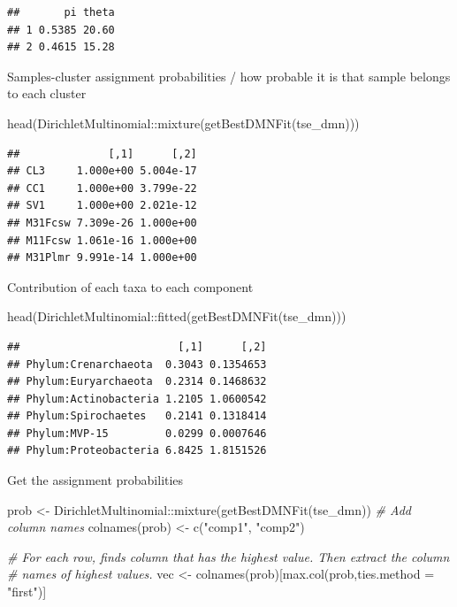\documentclass[
]{book}
\newenvironment{Shaded}{\begin{snugshade}}{\end{snugshade}}
\newcommand{\AttributeTok}[1]{\textcolor[rgb]{0.77,0.63,0.00}{#1}}
\newcommand{\CommentTok}[1]{\textcolor[rgb]{0.56,0.35,0.01}{\textit{#1}}}
\newcommand{\FunctionTok}[1]{\textcolor[rgb]{0.00,0.00,0.00}{#1}}
\newcommand{\NormalTok}[1]{#1}
\newcommand{\OtherTok}[1]{\textcolor[rgb]{0.56,0.35,0.01}{#1}}
\newcommand{\SpecialCharTok}[1]{\textcolor[rgb]{0.00,0.00,0.00}{#1}}
\newcommand{\StringTok}[1]{\textcolor[rgb]{0.31,0.60,0.02}{#1}}
\begin{document}
\begin{verbatim}
##       pi theta
## 1 0.5385 20.60
## 2 0.4615 15.28
\end{verbatim}

Samples-cluster assignment probabilities / how probable it is that sample belongs
to each cluster

\begin{Shaded}
\begin{Highlighting}[]
\FunctionTok{head}\NormalTok{(DirichletMultinomial}\SpecialCharTok{::}\FunctionTok{mixture}\NormalTok{(}\FunctionTok{getBestDMNFit}\NormalTok{(tse\_dmn)))}
\end{Highlighting}
\end{Shaded}

\begin{verbatim}
##              [,1]      [,2]
## CL3     1.000e+00 5.004e-17
## CC1     1.000e+00 3.799e-22
## SV1     1.000e+00 2.021e-12
## M31Fcsw 7.309e-26 1.000e+00
## M11Fcsw 1.061e-16 1.000e+00
## M31Plmr 9.991e-14 1.000e+00
\end{verbatim}

Contribution of each taxa to each component

\begin{Shaded}
\begin{Highlighting}[]
\FunctionTok{head}\NormalTok{(DirichletMultinomial}\SpecialCharTok{::}\FunctionTok{fitted}\NormalTok{(}\FunctionTok{getBestDMNFit}\NormalTok{(tse\_dmn)))}
\end{Highlighting}
\end{Shaded}

\begin{verbatim}
##                         [,1]      [,2]
## Phylum:Crenarchaeota  0.3043 0.1354653
## Phylum:Euryarchaeota  0.2314 0.1468632
## Phylum:Actinobacteria 1.2105 1.0600542
## Phylum:Spirochaetes   0.2141 0.1318414
## Phylum:MVP-15         0.0299 0.0007646
## Phylum:Proteobacteria 6.8425 1.8151526
\end{verbatim}

Get the assignment probabilities

\begin{Shaded}
\begin{Highlighting}[]
\NormalTok{prob }\OtherTok{\textless{}{-}}\NormalTok{ DirichletMultinomial}\SpecialCharTok{::}\FunctionTok{mixture}\NormalTok{(}\FunctionTok{getBestDMNFit}\NormalTok{(tse\_dmn))}
\CommentTok{\# Add column names}
\FunctionTok{colnames}\NormalTok{(prob) }\OtherTok{\textless{}{-}} \FunctionTok{c}\NormalTok{(}\StringTok{"comp1"}\NormalTok{, }\StringTok{"comp2"}\NormalTok{)}

\CommentTok{\# For each row, finds column that has the highest value. Then extract the column }
\CommentTok{\# names of highest values.}
\NormalTok{vec }\OtherTok{\textless{}{-}} \FunctionTok{colnames}\NormalTok{(prob)[}\FunctionTok{max.col}\NormalTok{(prob,}\AttributeTok{ties.method =} \StringTok{"first"}\NormalTok{)]}
\end{Highlighting}
\end{Shaded}
\end{document}
